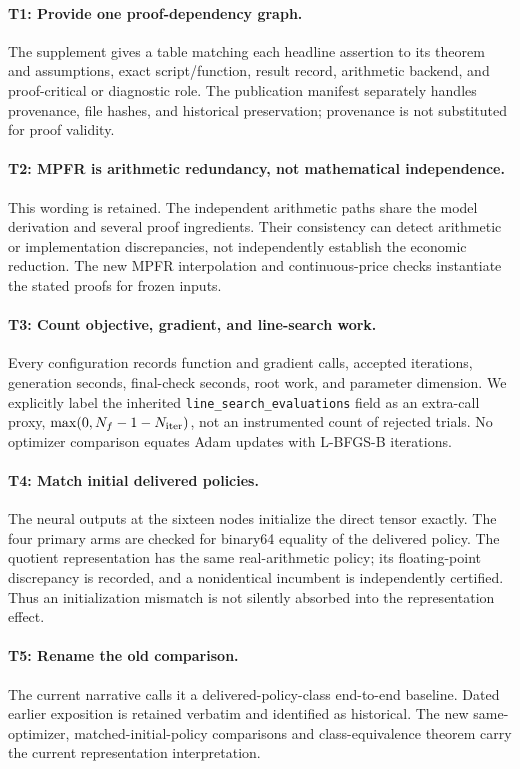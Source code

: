 \paragraph{T1: Provide one proof-dependency graph.}
The supplement gives a table matching each headline assertion to its theorem and assumptions, exact script/function, result record, arithmetic backend, and proof-critical or diagnostic role. The publication manifest separately handles provenance, file hashes, and historical preservation; provenance is not substituted for proof validity.

\paragraph{T2: MPFR is arithmetic redundancy, not mathematical independence.}
This wording is retained. The independent arithmetic paths share the model derivation and several proof ingredients. Their consistency can detect arithmetic or implementation discrepancies, not independently establish the economic reduction. The new MPFR interpolation and continuous-price checks instantiate the stated proofs for frozen inputs.

\paragraph{T3: Count objective, gradient, and line-search work.}
Every configuration records function and gradient calls, accepted iterations, generation seconds, final-check seconds, root work, and parameter dimension. We explicitly label the inherited \texttt{line\_search\_evaluations} field as an extra-call proxy, $\max(0,N_f-1-N_{\rm iter})$, not an instrumented count of rejected trials. No optimizer comparison equates Adam updates with L-BFGS-B iterations.

\paragraph{T4: Match initial delivered policies.}
The neural outputs at the sixteen nodes initialize the direct tensor exactly. The four primary arms are checked for binary64 equality of the delivered policy. The quotient representation has the same real-arithmetic policy; its floating-point discrepancy is recorded, and a nonidentical incumbent is independently certified. Thus an initialization mismatch is not silently absorbed into the representation effect.

\paragraph{T5: Rename the old comparison.}
The current narrative calls it a delivered-policy-class end-to-end baseline. Dated earlier exposition is retained verbatim and identified as historical. The new same-optimizer, matched-initial-policy comparisons and class-equivalence theorem carry the current representation interpretation.

